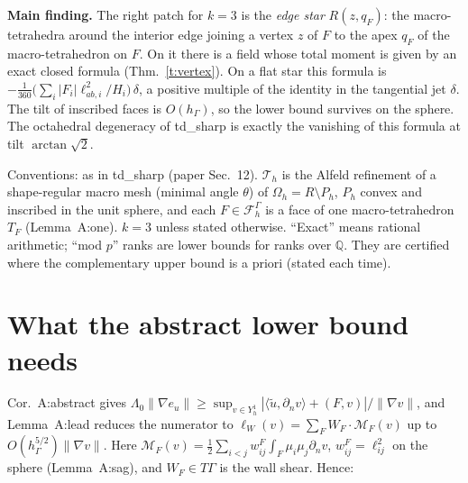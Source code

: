 \documentclass[11pt]{article}
\theoremstyle{definition}
\newcommand{\hG}{h_\Gamma}
\newcommand{\FG}{\mathcal F_h^\Gamma}
\newcommand{\M}{\mathcal M}
\newcommand{\Oh}{\Omega_h}
\newcommand{\Th}{\mathcal T_h}
\newcommand{\norm}[1]{\lVert #1\rVert}
\begin{document}
\noindent\textbf{Main finding.} The right patch for $k=3$ is the \emph{edge star} $R(z,q_F)$: the macro-tetrahedra around the interior edge joining a vertex $z$ of $F$ to the apex $q_F$ of the macro-tetrahedron on $F$. On it there is a field whose total moment is given by an exact closed formula (Thm.~\ref{t:vertex}). On a flat star this formula is $-\frac{1}{360}\bigl(\sum_i|F_i|\ell_{ab,i}^2/H_i\bigr)\,\delta$, a positive multiple of the identity in the tangential jet $\delta$. The tilt of inscribed faces is $O(\hG)$, so the lower bound survives on the sphere. The octahedral degeneracy of td\_sharp is exactly the vanishing of this formula at tilt $\arctan\sqrt2$.

Conventions: as in td\_sharp (paper Sec.~12). $\Th$ is the Alfeld refinement of a shape-regular macro mesh (minimal angle $\theta$) of $\Oh=R\setminus P_h$, $P_h$ convex and inscribed in the unit sphere, and each $F\in\FG$ is a face of one macro-tetrahedron $T_F$ (Lemma~A:one). $k=3$ unless stated otherwise. ``Exact'' means rational arithmetic; ``mod $p$'' ranks are lower bounds for ranks over $\mathbb Q$. They are certified where the complementary upper bound is a priori (stated each time).

\section{What the abstract lower bound needs}\label{s:need}
Cor.~A:abstract gives $\Lambda_0\norm{\nabla e_u}\ge\sup_{v\in Y_h^1}|\langle\tilde u,\partial_nv\rangle+(F,v)|/\norm{\nabla v}$, and Lemma~A:lead reduces the numerator to $\ell_W(v)=\sum_{F}W_F\cdot\M_F(v)$ up to $O(\hG^{5/2})\norm{\nabla v}$. Here $\M_F(v)=\frac12\sum_{i<j}w^F_{ij}\int_F\mu_i\mu_j\partial_nv$, $w^F_{ij}=\ell_{ij}^2$ on the sphere (Lemma~A:sag), and $W_F\in T\Gamma$ is the wall shear. Hence:
\end{document}
